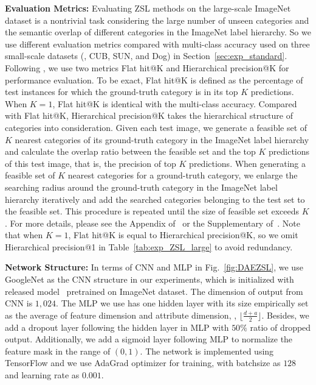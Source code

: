 \documentclass[journal]{IEEEtran}
\begin{document}
\noindent\textbf{Evaluation Metrics:}
Evaluating ZSL methods on the large-scale ImageNet dataset is a nontrivial task considering the large number of unseen categories and the semantic overlap of different categories in the ImageNet label hierarchy. So we use different evaluation metrics compared with multi-class accuracy used on three small-scale datasets (\ie, CUB, SUN, and Dog) in Section~\ref{sec:exp_standard}.
Following \cite{frome2013devise}, we use two metrics Flat hit@K and Hierarchical precision@K for performance evaluation. To be exact, Flat hit@K is defined as the percentage of test instances for which the ground-truth category is in its top $K$ predictions. When $K=1$, Flat hit@K is identical with the multi-class accuracy. Compared with Flat hit@K, Hierarchical precision@K takes the hierarchical structure of categories into consideration. Given each test image, we generate a feasible set of $K$ nearest categories of its ground-truth category in the ImageNet label hierarchy and calculate the overlap ratio between the feasible set and the top $K$ predictions of this test image, that is, the precision of top $K$ predictions. When generating a feasible set of $K$ nearest categories for a ground-truth category, we enlarge the searching radius around the ground-truth category in the ImageNet label hierarchy iteratively and add the searched categories belonging to the test set to the feasible set. This procedure is repeated until the size of feasible set exceeds $K$. For more details, please see the Appendix of~\cite{frome2013devise} or the Supplementary of~\cite{changpinyo2016synthesized}. Note that when $K=1$, Flat hit@K is equal to Hierarchical precision@K, so we omit Hierarchical precision@1 in Table~\ref{tab:exp_ZSL_large} to avoid redundancy.

\noindent\textbf{Network Structure:}
In terms of CNN and MLP in Fig.~\ref{fig:DAEZSL}, we use GoogleNet  as the CNN structure in our experiments, which is initialized with released model~\cite{szegedy2015going} pretrained on ImageNet dataset. The dimension of output from CNN is $1,024$. 
The MLP we use has one hidden layer with its size empirically set as the average of feature dimension and attribute dimension, \ie, $\lfloor \frac{d+a}{2}\rfloor$. Besides, we add a dropout layer following the hidden layer in MLP with $50\%$ ratio of dropped output. Additionally, we add a sigmoid layer following MLP to normalize the feature mask in the range of $(0,1)$.
The network is implemented using TensorFlow and we use AdaGrad optimizer for training, with batchsize as $128$ and learning rate as $0.001$.
\end{document}
